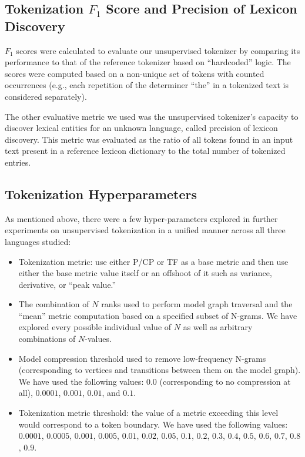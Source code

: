 \documentclass[11pt]{article}
\begin{document}
\subsection{Tokenization $F_1$ Score and Precision of Lexicon Discovery}

$F_1$ scores were calculated to evaluate our unsupervised tokenizer by comparing its performance to that of the reference tokenizer based on “hardcoded” logic. The scores were computed based on a non-unique set of tokens with counted occurrences (e.g., each repetition of the determiner “the” in a tokenized text is considered separately).

The other evaluative metric we used was the unsupervised tokenizer’s capacity to discover lexical entities for an unknown language, called precision of lexicon discovery. This metric was evaluated as the ratio of all tokens found in an input text present in a reference lexicon dictionary to the total number of tokenized entries.

\subsection{\label{35}Tokenization Hyperparameters}

As mentioned above, there were a few hyper-parameters explored in further experiments on unsupervised tokenization in a unified manner across all three languages studied:
\begin{itemize}
\item Tokenization metric: use either P/CP or TF as a base metric and then use either the base metric value itself or an offshoot of it such as variance, derivative, or “peak value.”
\item The combination of $N$ ranks used to perform model graph traversal and the “mean” metric computation based on a specified subset of N-grams. We have explored every possible individual value of $N$ as well as arbitrary combinations of $N$-values.     
\item Model compression threshold used to remove low-frequency N-grams (corresponding to vertices and transitions between them on the model graph). We have used the following values: $0.0$ (corresponding to no compression at all), $0.0001$, $0.001$, $0.01$, and $0.1$.
\item Tokenization metric threshold: the value of a metric exceeding this level would correspond to a token boundary. We have used the following values: $0.0001$, $0.0005$, $0.001$, $0.005$, $0.01$, $0.02$, $0.05$, $0.1$, $0.2$, $0.3$, $0.4$, $0.5$, $0.6$, $0.7$, $0.8$, $0.9$.
\end{itemize}
\end{document}
